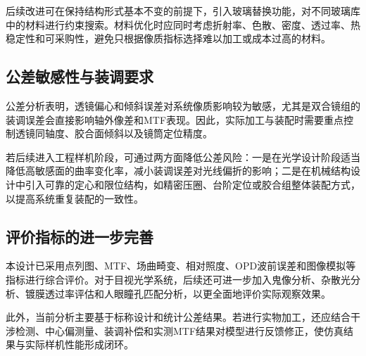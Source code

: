 后续改进可在保持结构形式基本不变的前提下，引入玻璃替换功能，对不同玻璃库中的材料进行约束搜索。材料优化时应同时考虑折射率、色散、密度、透过率、热稳定性和可采购性，避免只根据像质指标选择难以加工或成本过高的材料。

\subsection{公差敏感性与装调要求}

公差分析表明，透镜偏心和倾斜误差对系统像质影响较为敏感，尤其是双合镜组的装调误差会直接影响轴外像差和MTF表现。因此，实际加工与装配时需要重点控制透镜同轴度、胶合面倾斜以及镜筒定位精度。

若后续进入工程样机阶段，可通过两方面降低公差风险：一是在光学设计阶段适当降低高敏感面的曲率变化率，减小装调误差对光线偏折的影响；二是在机械结构设计中引入可靠的定心和限位结构，如精密压圈、台阶定位或胶合组整体装配方式，以提高系统重复装配的一致性。

\subsection{评价指标的进一步完善}

本设计已采用点列图、MTF、场曲畸变、相对照度、OPD波前误差和图像模拟等指标进行综合评价。对于目视光学系统，后续还可进一步加入鬼像分析、杂散光分析、镀膜透过率评估和人眼瞳孔匹配分析，以更全面地评价实际观察效果。

此外，当前分析主要基于标称设计和统计公差结果。若进行实物加工，还应结合干涉检测、中心偏测量、装调补偿和实测MTF结果对模型进行反馈修正，使仿真结果与实际样机性能形成闭环。
